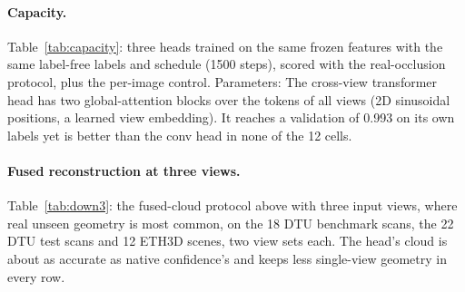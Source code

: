\begin{table}[h]
\centering
\caption{\textbf{Real occlusion against dense references, every cell.} \auroc{} for predicted points on observed against unobserved surfaces, mean over scenes (two seeds each); paired sign-flip $p$ over scenes. \emph{ambiguous}: share of predicted points the hole-robust labels leave out. \emph{claim}: yes / no where the cell qualifies (unobserved share $\ge 0.5\%$), -- where the share is below 0.5\%. DTU benchmark 18 scans, DTU test 22, ETH3D 12 scenes, TUM RGB-D 12 sequences, CO3Dv2 18 scenes.}
\label{tab:realocc}
\scriptsize
\setlength{\tabcolsep}{2.5pt}
\resizebox{\textwidth}{!}{}
\end{table}

\paragraph{Capacity.}
Table~\ref{tab:capacity}: three heads trained on the same frozen features with the same label-free labels and schedule (1500 steps), scored with the real-occlusion protocol, plus the per-image control. Parameters:  The cross-view transformer head has two global-attention blocks over the tokens of all views (2D sinusoidal positions, a learned view embedding). It reaches a validation \auroc{} of 0.993 on its own labels yet is better than the conv head in none of the 12 cells.

\begin{table}[h]
\centering
\caption{\textbf{Capacity on real occlusion.} \auroc{} observed against unobserved points, mean over scenes; last column paired sign-flip over scenes. This comparison was run before the hole-robust labels, so its ETH3D cells include the ambiguous points; on DTU alone the reading is the same.}
\label{tab:capacity}
\scriptsize
\setlength{\tabcolsep}{3pt}
\resizebox{\textwidth}{!}{}
\end{table}

\paragraph{Fused reconstruction at three views.}
Table~\ref{tab:down3}: the fused-cloud protocol above with three input views, where real unseen geometry is most common, on the 18 DTU benchmark scans, the 22 DTU test scans and 12 ETH3D scenes, two view sets each. The head's cloud is about as accurate as native confidence's and keeps less single-view geometry in every row.

